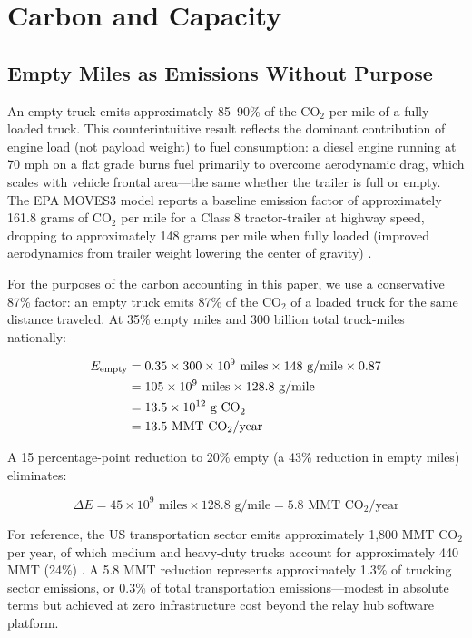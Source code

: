 \section{Carbon and Capacity}
\label{sec:carbon}

\subsection{Empty Miles as Emissions Without Purpose}

An empty truck emits approximately 85--90\% of the CO$_2$ per mile of a fully loaded truck. This counterintuitive result reflects the dominant contribution of engine load (not payload weight) to fuel consumption: a diesel engine running at 70 mph on a flat grade burns fuel primarily to overcome aerodynamic drag, which scales with vehicle frontal area---the same whether the trailer is full or empty. The EPA MOVES3 model reports a baseline emission factor of approximately 161.8 grams of CO$_2$ per mile for a Class 8 tractor-trailer at highway speed, dropping to approximately 148 grams per mile when fully loaded (improved aerodynamics from trailer weight lowering the center of gravity) \citep{EPA_MOVES3}.

For the purposes of the carbon accounting in this paper, we use a conservative 87\% factor: an empty truck emits 87\% of the CO$_2$ of a loaded truck for the same distance traveled. At 35\% empty miles and 300 billion total truck-miles nationally:

\begin{align}
  E_{\text{empty}} &= 0.35 \times 300 \times 10^9 \text{ miles} \times 148 \text{ g/mile} \times 0.87 \notag \\
  &= 105 \times 10^9 \text{ miles} \times 128.8 \text{ g/mile} \notag \\
  &= 13.5 \times 10^{12} \text{ g CO}_2 \notag \\
  &= 13.5 \text{ MMT CO}_2/\text{year}
\end{align}

A 15 percentage-point reduction to 20\% empty (a 43\% reduction in empty miles) eliminates:

\begin{equation}
  \Delta E = 45 \times 10^9 \text{ miles} \times 128.8 \text{ g/mile} = 5.8 \text{ MMT CO}_2/\text{year}
\end{equation}

For reference, the US transportation sector emits approximately 1,800 MMT CO$_2$ per year, of which medium and heavy-duty trucks account for approximately 440 MMT (24\%) \citep{EPA_GHG2023}. A 5.8 MMT reduction represents approximately 1.3\% of trucking sector emissions, or 0.3\% of total transportation emissions---modest in absolute terms but achieved at zero infrastructure cost beyond the relay hub software platform.

